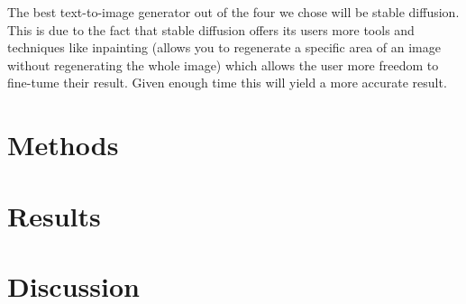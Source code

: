 \documentclass[]{report}
\begin{document}
	The best text-to-image generator out of the four we chose will be stable diffusion. This is due to the fact that stable diffusion offers its users more tools and techniques like inpainting (allows you to regenerate a specific area of an image without regenerating the whole image) which allows the user more freedom to fine-tume their result. Given enough time this will yield a more accurate result. 
	
	
	\section{Methods}
	\lipsum
	\section{Results}
	\newpage	
	\section{Discussion}
	
\end{document}
